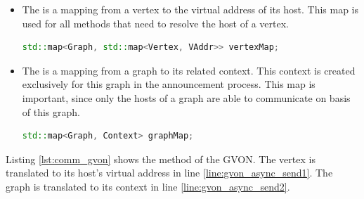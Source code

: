\begin{itemize}
\item [] The  is a mapping from a vertex to the virtual
address of its host.  This map is used for all methods
that need to resolve the host of a vertex.

\begin{minipage}[t]{\textwidth} 
\begin{lstlisting}[language=C++, label=lst:mapping1]
std::map<Graph, std::map<Vertex, VAddr>> vertexMap;
\end{lstlisting}
\end{minipage}


\item [] The  is a mapping from a graph to its related
  context. This context is created exclusively for this graph in the
  announcement process.  This map is important, since only the hosts
  of a graph are able to communicate on basis of this graph.

  \begin{minipage}[t]{\textwidth} 
    \begin{lstlisting}[language=C++, label=lst:mapping2]
std::map<Graph, Context> graphMap;
    \end{lstlisting}
    \end{minipage}


\end{itemize}

\noindent Listing \ref{lst:comm_gvon} shows the  method of the
GVON. The vertex is translated to its host's virtual address in line
\ref{line:gvon_async_send1}. The graph is translated to its context
in line \ref{line:gvon_async_send2}.

